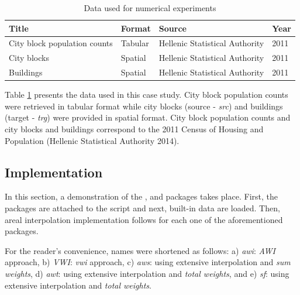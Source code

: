 \begin{table}

\caption{\label{tab:dtbl-ltx}Data used for numerical experiments}
\centering
\fontsize{7}{9}\selectfont
\begin{tabular}[t]{l|l|l|l}
\hline
Title & Format & Source & Year\\
\hline
City block population counts & Tabular & Hellenic Statistical Authority & 2011\\
\hline
City blocks & Spatial & Hellenic Statistical Authority & 2011\\
\hline
Buildings & Spatial & Hellenic Statistical Authority & 2011\\
\hline
\end{tabular}
\end{table}

Table \ref{tab:dtbl-ltx} presents the data used in this case study. City block population counts were retrieved in tabular format while city blocks (source - \emph{src}) and buildings (target - \emph{trg}) were provided in spatial format. City block population counts and city blocks and buildings correspond to the 2011 Census of Housing and Population (Hellenic Statistical Authority 2014).

\hypertarget{implementation}{%
\subsection{Implementation}\label{implementation}}

In this section, a demonstration of the ,  and  packages takes place. First, the packages are attached to the script and next,  built-in data are loaded. Then, areal interpolation
implementation follows for each one of the aforementioned packages.

For the reader's convenience, names were shortened as follows: a) \emph{awi}:  \emph{AWI} approach, b)
\emph{VWI}:  \emph{vwi} approach, c) \emph{aws}:  using extensive interpolation and \emph{sum weights}, d) \emph{awt}:  using extensive interpolation and \emph{total weights}, and e) \emph{sf}:  using extensive interpolation and \emph{total weights}.

